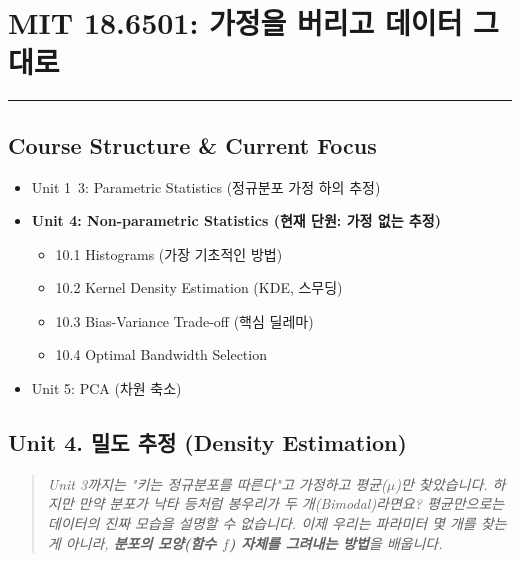 \documentclass[11pt,a4paper]{book}
\theoremstyle{definition}
\begin{document}
\chapter{MIT 18.6501: 가정을 버리고 데이터 그대로}
\label{ch:lecture10}


\vspace{1cm}
\hrule
\vspace{1cm}

\section*{Course Structure \& Current Focus}
\begin{itemize}
    \item Unit 1~3: Parametric Statistics (정규분포 가정 하의 추정)
    \item \textbf{\textcolor{mainblue}{Unit 4: Non-parametric Statistics (현재 단원: 가정 없는 추정)}}
    \begin{itemize}
        \item 10.1 Histograms (가장 기초적인 방법)
        \item 10.2 Kernel Density Estimation (KDE, 스무딩)
        \item 10.3 Bias-Variance Trade-off (핵심 딜레마)
        \item 10.4 Optimal Bandwidth Selection
    \end{itemize}
    \item Unit 5: PCA (차원 축소)
\end{itemize}


\section{Unit 4. 밀도 추정 (Density Estimation)}

\begin{quote}
\textit{Unit 3까지는 "키는 정규분포를 따른다"고 가정하고 평균($\mu$)만 찾았습니다. 하지만 만약 분포가 낙타 등처럼 봉우리가 두 개(Bimodal)라면요? 평균만으로는 데이터의 진짜 모습을 설명할 수 없습니다. 이제 우리는 파라미터 몇 개를 찾는 게 아니라, \textbf{분포의 모양(함수 $f$) 자체를 그려내는 방법}을 배웁니다.}
\end{quote}
\end{document}
